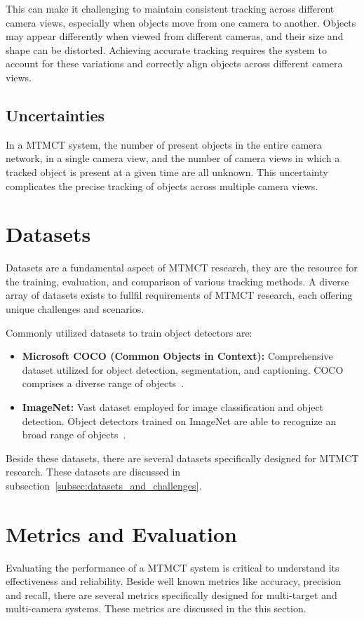 This can make it challenging to maintain consistent tracking across different camera views, especially when objects move from one camera to another. Objects may appear differently when viewed from different cameras, and their size and shape can be distorted. Achieving accurate tracking requires the system to account for these variations and correctly align objects across different camera views.

\subsection{Uncertainties}\label{subsec:uncertainties}
In a MTMCT system, the number of present objects in the entire camera network, in a single camera view, and the number of camera views in which a tracked object is present at a given time are all unknown. This uncertainty complicates the precise tracking of objects across multiple camera views.

\section{Datasets}\label{sec:datasets}
Datasets are a fundamental aspect of MTMCT research, they are the resource for the training, evaluation, and comparison of various tracking methods. A diverse array of datasets exists to fullfil requirements of MTMCT research, each offering unique challenges and scenarios.

Commonly utilized datasets to train object detectors are:

\begin{itemize}
    \item \textbf{Microsoft COCO (Common Objects in Context):} Comprehensive dataset utilized for object detection, segmentation, and captioning. COCO comprises a diverse range of objects~\cite{Lin14}.
    \item \textbf{ImageNet:} Vast dataset employed for image classification and object detection. Object detectors trained on ImageNet are able to recognize an broad range of objects~\cite{Deng09}.
\end{itemize}

Beside these datasets, there are several datasets specifically designed for MTMCT research. These datasets are discussed in subsection~\ref{subsec:datasets_and_challenges}.

\section{Metrics and Evaluation}\label{sec:metrics_and_evaluation}
Evaluating the performance of a MTMCT system is critical to understand its effectiveness and reliability. Beside well known metrics like accuracy, precision and recall, there are several metrics specifically designed for multi-target and multi-camera systems. These metrics are discussed in the this section.

